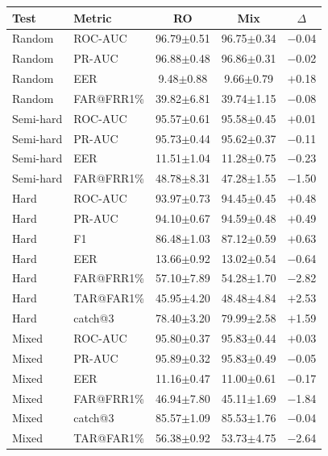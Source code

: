 \documentclass[11pt]{article}
\begin{document}
\begin{table}[!t]
\centering
\scriptsize
\begin{minipage}[t]{0.48\textwidth}
\centering
\begin{tabular}{l l c c c}
\toprule
\textbf{Test} & \textbf{Metric} & \textbf{RO} & \textbf{Mix} & \textbf{$\Delta$} \\
\midrule
Random    & ROC-AUC    & 96.79$\pm$0.51 & 96.75$\pm$0.34 & $-$0.04 \\
Random    & PR-AUC     & 96.88$\pm$0.48 & 96.86$\pm$0.31 & $-$0.02 \\
Random    & EER        & \phantom{0}9.48$\pm$0.88 & \phantom{0}9.66$\pm$0.79 & $+$0.18 \\
Random    & FAR@FRR1\% & 39.82$\pm$6.81 & 39.74$\pm$1.15 & $-$0.08 \\
\midrule
Semi-hard & ROC-AUC    & 95.57$\pm$0.61 & 95.58$\pm$0.45 & $+$0.01 \\
Semi-hard & PR-AUC     & 95.73$\pm$0.44 & 95.62$\pm$0.37 & $-$0.11 \\
Semi-hard & EER        & 11.51$\pm$1.04 & 11.28$\pm$0.75 & $-$0.23 \\
Semi-hard & FAR@FRR1\% & 48.78$\pm$8.31 & 47.28$\pm$1.55 & $-$1.50 \\
\midrule
Hard      & ROC-AUC    & 93.97$\pm$0.73 & 94.45$\pm$0.45 & $+$0.48 \\
Hard      & PR-AUC     & 94.10$\pm$0.67 & 94.59$\pm$0.48 & $+$0.49 \\
Hard      & F1         & 86.48$\pm$1.03 & 87.12$\pm$0.59 & $+$0.63 \\
Hard      & EER        & 13.66$\pm$0.92 & 13.02$\pm$0.54 & $-$0.64 \\
Hard      & FAR@FRR1\% & 57.10$\pm$7.89 & 54.28$\pm$1.70 & $-$2.82 \\
Hard      & TAR@FAR1\% & 45.95$\pm$4.20 & 48.48$\pm$4.84 & $+$2.53 \\
Hard      & catch@3    & 78.40$\pm$3.20 & 79.99$\pm$2.58 & $+$1.59 \\
\midrule
Mixed     & ROC-AUC    & 95.80$\pm$0.37 & 95.83$\pm$0.44 & $+$0.03 \\
Mixed     & PR-AUC     & 95.89$\pm$0.32 & 95.83$\pm$0.49 & $-$0.05 \\
Mixed     & EER        & 11.16$\pm$0.47 & 11.00$\pm$0.61 & $-$0.17 \\
Mixed     & FAR@FRR1\% & 46.94$\pm$7.80 & 45.11$\pm$1.69 & $-$1.84 \\
Mixed     & catch@3    & 85.57$\pm$1.09 & 85.53$\pm$1.76 & $-$0.04 \\
Mixed     & TAR@FAR1\% & 56.38$\pm$0.92 & 53.73$\pm$4.75 & $-$2.64 \\
\bottomrule
\end{tabular}
\label{tab:app_sbert_pan_distilbert}


\end{minipage}
\end{table}
\end{document}
